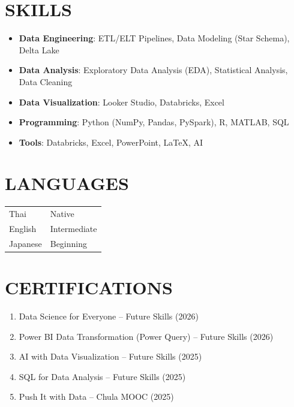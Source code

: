\documentclass[11pt,a4paper]{article}
\begin{document}
\section*{SKILLS}
\begin{itemize}
    \item \textbf{Data Engineering}: ETL/ELT Pipelines, Data Modeling (Star Schema), Delta Lake
    \item \textbf{Data Analysis}: Exploratory Data Analysis (EDA), Statistical Analysis, Data Cleaning
       \item \textbf{Data Visualization}: Looker Studio, Databricks, Excel
    \item \textbf{Programming}: Python (NumPy, Pandas, PySpark), R, MATLAB, SQL
    \item \textbf{Tools}: Databricks, Excel, PowerPoint, LaTeX, AI
\end{itemize}


\section*{LANGUAGES}

\begin{tabular}{ll}
Thai & Native \\
English & Intermediate \\
Japanese & Beginning
\end{tabular}

\section*{CERTIFICATIONS}
\begin{enumerate}[leftmargin=*]
\item Data Science for Everyone -- Future Skills (2026)
\item Power BI Data Transformation (Power Query) -- Future Skills (2026)
\item AI with Data Visualization -- Future Skills (2025)
\item SQL for Data Analysis -- Future Skills (2025)
\item Push It with Data -- Chula MOOC (2025)
\end{enumerate}
\end{document}
